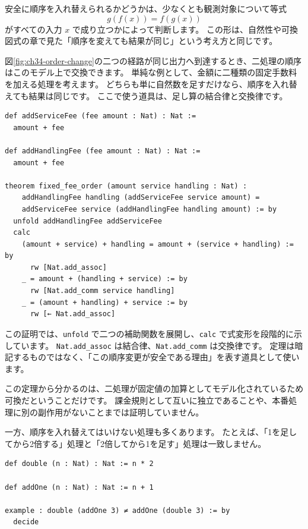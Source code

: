 安全に順序を入れ替えられるかどうかは、少なくとも観測対象について等式
\[
  g(f(x)) = f(g(x))
\]
がすべての入力 \(x\) で成り立つかによって判断します。
この形は、自然性や可換図式の章で見た「順序を変えても結果が同じ」という考え方と同じです。


図\ref{fig:ch34-order-change}の二つの経路が同じ出力へ到達するとき、二処理の順序はこのモデル上で交換できます。
単純な例として、金額に二種類の固定手数料を加える処理を考えます。
どちらも単に自然数を足すだけなら、順序を入れ替えても結果は同じです。
ここで使う道具は、足し算の結合律と交換律です。

\begin{listing}[htbp]
\begin{verbatim}
def addServiceFee (fee amount : Nat) : Nat :=
  amount + fee

def addHandlingFee (fee amount : Nat) : Nat :=
  amount + fee

theorem fixed_fee_order (amount service handling : Nat) :
    addHandlingFee handling (addServiceFee service amount) =
    addServiceFee service (addHandlingFee handling amount) := by
  unfold addHandlingFee addServiceFee
  calc
    (amount + service) + handling = amount + (service + handling) := by
      rw [Nat.add_assoc]
    _ = amount + (handling + service) := by
      rw [Nat.add_comm service handling]
    _ = (amount + handling) + service := by
      rw [← Nat.add_assoc]
\end{verbatim}
\caption{\texttt{fixed\_fee\_order}}
\label{lst:ch34-order-preserves}
\end{listing}

この証明では、\texttt{unfold} で二つの補助関数を展開し、\texttt{calc} で式変形を段階的に示しています。
\texttt{Nat.add\_assoc} は結合律、\texttt{Nat.add\_comm} は交換律です。
定理は暗記するものではなく、「この順序変更が安全である理由」を表す道具として使います。

この定理から分かるのは、二処理が固定値の加算としてモデル化されているため可換だということだけです。
課金規則として互いに独立であることや、本番処理に別の副作用がないことまでは証明していません。

一方、順序を入れ替えてはいけない処理も多くあります。
たとえば、「1を足してから2倍する」処理と「2倍してから1を足す」処理は一致しません。

\begin{listing}[htbp]
\begin{verbatim}
def double (n : Nat) : Nat := n * 2

def addOne (n : Nat) : Nat := n + 1

example : double (addOne 3) ≠ addOne (double 3) := by
  decide
\end{verbatim}
\caption{\texttt{double}・\texttt{addOne}}
\label{lst:ch34-order-not-always-safe}
\end{listing}

